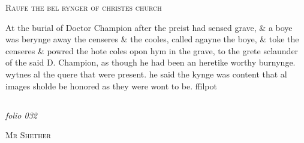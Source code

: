 \documentclass[12pt, a4paper]{book}
\begin{document}
            
            	
				\begin{center} \begin{large} {\scshape Raufe the bel rynger of christes church} \end{large} \end{center}
			


	
				\marginpar[\vspace{0.5cm}{\textcolor{Gray}{n}}]{}
			
	
				\marginpar[\vspace{0.5cm}{\textcolor{Gray}{Images}}]{}
			
	
		\ifthenelse{\isodd{\thepage}}
		{\reversemarginpar}
		{\normalmarginpar}
		At the burial of Doctor Champion after the preist had sensed
 grave, \& a boye was berynge away the censeres \& the cooles,
 called agayne the boye, \& toke the censeres \& powred the hote
 coles opon hym in the grave, to the grete sclaunder of the said
		D. Champion, as though he had been an heretike worthy
 burnynge. wytnes al the quere that were present.
 he said the kynge was content that al images sholde be honored as
 they were wont to be. ffilpot



            
\dotfill
						\newpage {} \subsection*{}  \subsection*{}  \subsection*{}  \subsection*{}

\textit{folio 032}


            
            	
				\begin{center} \begin{large} {\scshape Mr Shether} \end{large} \end{center}
			
\end{document}
